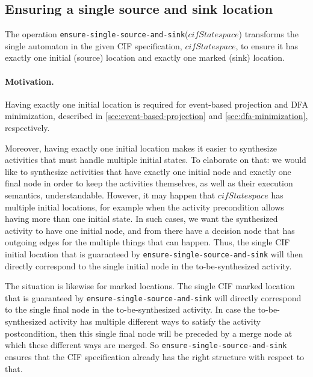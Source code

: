 \documentclass{article}
\newcommand{\keyw}[1]{\texttt{#1}}
\newcommand{\var}[1]{\ensuremath{\mathit{#1}}}
\newcommand{\ensureSingleSourceAndSinkLabel}[0]{\keyw{ensure-single-source-and-sink}}
\newcommand{\ensureSingleSourceAndSink}[1]{\ensureSingleSourceAndSinkLabel(\ensuremath{#1})}
\theoremstyle{definition}
\begin{document}
\subsection{Ensuring a single source and sink location}
\label{sec:single-source-and-sink}

The operation \ensureSingleSourceAndSink{\var{cifStatespace}} transforms the single automaton in the given CIF specification, \var{cifStatespace}, to ensure it has exactly one initial (source) location and exactly one marked (sink) location.

\paragraph{Motivation.}
Having exactly one initial location is required for event-based projection and DFA minimization, described in \autoref{sec:event-based-projection} and \autoref{sec:dfa-minimization}, respectively.

Moreover, having exactly one initial location makes it easier to synthesize activities that must handle multiple initial states.
To elaborate on that: we would like to synthesize activities that have exactly one initial node and exactly one final node in order to keep the activities themselves, as well as their execution semantics, understandable.
However, it may happen that \var{cifStatespace} has multiple initial locations, for example when the activity precondition allows having more than one initial state.
In such cases, we want the synthesized activity to have one initial node, and from there have a decision node that has outgoing edges for the multiple things that can happen.
Thus, the single CIF initial location that is guaranteed by \ensureSingleSourceAndSinkLabel{} will then directly correspond to the single initial node in the to-be-synthesized activity.

The situation is likewise for marked locations.
The single CIF marked location that is guaranteed by \ensureSingleSourceAndSinkLabel{} will directly correspond to the single final node in the to-be-synthesized activity.
In case the to-be-synthesized activity has multiple different ways to satisfy the activity postcondition, then this single final node will be preceded by a merge node at which these different ways are merged.
So \ensureSingleSourceAndSinkLabel{} ensures that the CIF specification already has the right structure with respect to that.
\end{document}
